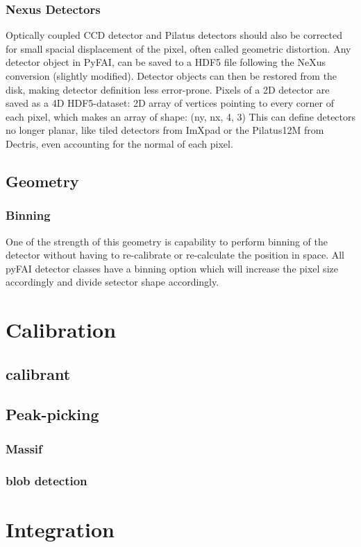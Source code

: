 \documentclass[preprint]{iucr}
\begin{document}
\subsubsection{Nexus Detectors}
Optically coupled CCD detector and Pilatus detectors should also be corrected
for small spacial displacement of the pixel, often called geometric distortion. 
Any detector object in PyFAI, can be saved to a HDF5 file
following the NeXus conversion (slightly modified).
Detector objects can then be restored from the disk, making detector definition
less error-prone.
Pixels of a 2D detector are saved as a 4D HDF5-dataset: 2D array of vertices
pointing to every corner of each pixel, which makes an array of shape: (ny, nx, 4, 3)
This can define detectors no longer planar, like tiled detectors from 
ImXpad or the Pilatus12M from Dectris, even accounting for the normal of each
pixel.

\subsection{Geometry}

\subsubsection{Binning}
One of the strength of this geometry is capability to perform binning of the
detector without having to re-calibrate or re-calculate the position in space.
All pyFAI detector classes have a binning option which will increase the pixel
size accordingly and divide setector shape accordingly.
\section{Calibration}
\subsection{calibrant}
\subsection{Peak-picking}
\subsubsection{Massif}
\subsubsection{blob detection}
\section{Integration}
\end{document}
